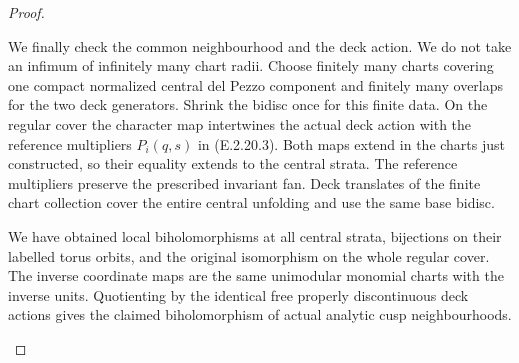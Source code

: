 \begin{proof}
\begin{enumerate}[label={$\langle1\rangle$\arabic*.},leftmargin=*]
We finally check the
common neighbourhood
and the deck action.
We do not take an
infimum of infinitely
many chart radii.
Choose finitely many
charts covering one
compact normalized
central del Pezzo
component and finitely
many overlaps for
the two deck generators.
Shrink the bidisc once
for this finite data.
On the regular cover
the character map
intertwines the actual
deck action with the
reference multipliers
$P_i(q,s)$ in
(E.2.20.3).  Both maps
extend in the charts
just constructed, so
their equality extends
to the central strata.
The reference multipliers
preserve the prescribed
invariant fan.  Deck
translates of the finite
chart collection cover
the entire central
unfolding and use the
same base bidisc.

We have obtained local
biholomorphisms at all
central strata, bijections
on their labelled torus
orbits, and the original
isomorphism on the whole
regular cover.  The
inverse coordinate maps
are the same unimodular
monomial charts with
the inverse units.
Quotienting by the
identical free properly
discontinuous deck
actions gives the
claimed biholomorphism
of actual analytic
cusp neighbourhoods.

\end{enumerate}
\end{proof}
